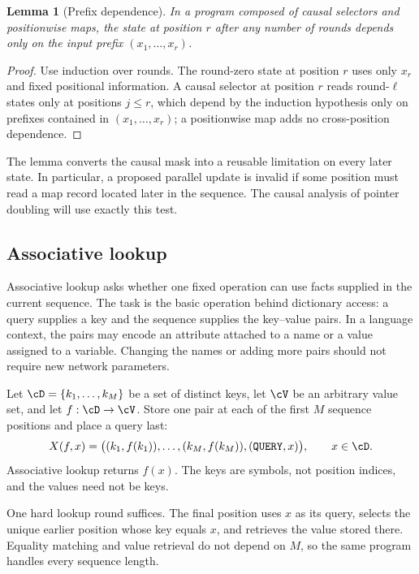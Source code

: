 \documentclass[11pt,twoside]{article}
\newtheorem{lemma}[theorem]{Lemma}
\theoremstyle{definition}
\theoremstyle{remark}
\begin{document}
\begin{lemma}[Prefix dependence]
\label{prop:prefix-causality}
In a program composed of causal selectors and positionwise maps, the state at
position $r$ after any number of rounds depends only on the input prefix
$(x_1,\ldots,x_r)$.
\end{lemma}

\begin{proof}
Use induction over rounds. The round-zero state at position $r$ uses only
$x_r$ and fixed positional information. A causal selector at position $r$
reads round-$\ell$ states only at positions $j\leq r$, which depend by the
induction hypothesis only on prefixes contained in $(x_1,\ldots,x_r)$; a
positionwise map adds no cross-position dependence.
\end{proof}

The lemma converts the causal mask into a reusable limitation on every later
state. In particular, a proposed parallel update is invalid if some position
must read a map record located later in the sequence. The causal analysis of
pointer doubling will use exactly this test.

\subsection{Associative lookup}

Associative lookup asks whether one fixed operation can use facts supplied in
the current sequence. The task is the basic operation behind dictionary
access: a query supplies a key and the sequence supplies the key--value
pairs. In a language context, the pairs may encode an attribute attached to a
name or a value assigned to a variable. Changing the names or adding more
pairs should not require new network parameters.

Let $\cD=\{k_1,\ldots,k_M\}$ be a set of distinct keys, let $\cV$ be an
arbitrary value set, and let $f:\cD\to\cV$. Store one pair at each of the
first $M$ sequence positions and place a query last:
\begin{equation}
 X(f,x)=\bigl((k_1,f(k_1)),\ldots,(k_M,f(k_M)),
 (\mathtt{QUERY},x)\bigr),
 \qquad x\in\cD.
 \label{eq:lookup-prompt}
\end{equation}
Associative lookup returns $f(x)$. The keys are symbols, not position
indices, and the values need not be keys.

One hard lookup round suffices. The final position uses $x$ as its query,
selects the unique earlier position whose key equals $x$, and retrieves the
value stored there. Equality matching and value retrieval do not depend on
$M$, so the same program handles every sequence length.
\end{document}
